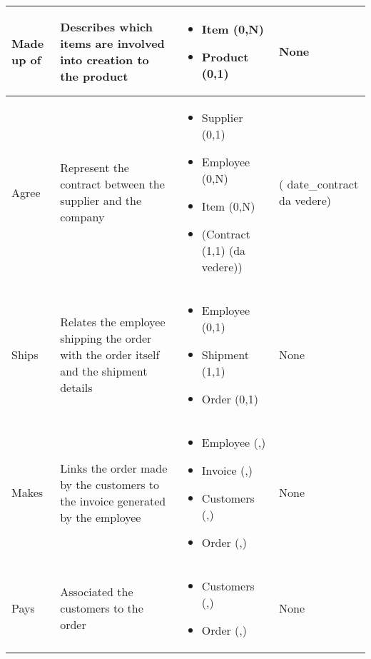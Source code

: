 \begin{longtable}{|p{}|p{} |p{}|p{} |}
Made up of & Describes which items are involved into creation to the product & \begin{itemize}
	\vspace{-1em}
	\item Item (0,N)
	\item Product (0,1)
\end{itemize}
&  None \\\hline

Agree & Represent the contract between the supplier and the company  & \begin{itemize}
	\vspace{-1em}
	\item Supplier (0,1) 
	\item Employee (0,N)
	\item Item    (0,N)
    \item (Contract  (1,1) (da vedere))
	\end{itemize}
&  ( date\_contract da vedere)\\\hline

Ships & Relates the employee shipping the order with the order itself and the shipment details & \begin{itemize}
	\vspace{-1em}
	\item Employee (0,1)
	\item Shipment (1,1)
	\item Order (0,1)
\end{itemize}
&  None \\\hline

Makes & Links the order made by the customers to the invoice generated by the employee & \begin{itemize}
	\vspace{-1em}
	\item Employee (,)
	\item Invoice (,)
	\item Customers (,)
	\item Order  (,)
\end{itemize}
&  None \\\hline

Pays & Associated the customers to the order & \begin{itemize}
	\vspace{-1em}
	\item Customers (,)
	\item Order  (,)
\end{itemize}
&  None \\\hline


\end{longtable}